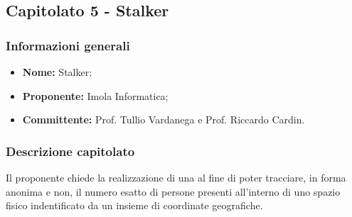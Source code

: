 \subsection{Capitolato 5 - Stalker}

	\subsubsection{Informazioni generali}
		\begin{itemize}
			\item \textbf{Nome:} Stalker;
			\item \textbf{Proponente:} Imola Informatica;
			\item \textbf{Committente: }Prof. Tullio Vardanega e Prof. Riccardo Cardin.
		\end{itemize}

	\subsubsection{Descrizione capitolato}
		Il proponente chiede la realizzazione di una  al fine di poter tracciare, in forma anonima e non, il numero esatto di persone presenti all'interno di uno spazio fisico indentificato da un insieme di coordinate geografiche.

